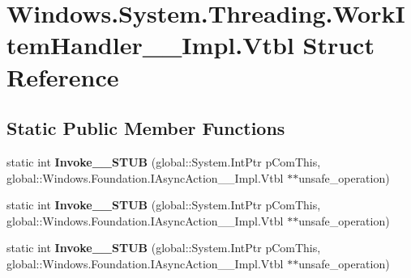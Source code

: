\hypertarget{struct_windows_1_1_system_1_1_threading_1_1_work_item_handler_____impl_1_1_vtbl}{}\section{Windows.\+System.\+Threading.\+Work\+Item\+Handler\+\_\+\+\_\+\+Impl.\+Vtbl Struct Reference}
\label{struct_windows_1_1_system_1_1_threading_1_1_work_item_handler_____impl_1_1_vtbl}
\subsection*{Static Public Member Functions}
\begin{DoxyCompactItemize}
\item 
\mbox{\label{struct_windows_1_1_system_1_1_threading_1_1_work_item_handler_____impl_1_1_vtbl_ac5bdfd83481e2965038502f8e644d2c7}} 
static int {\bfseries Invoke\+\_\+\+\_\+\+S\+T\+UB} (global\+::\+System.\+Int\+Ptr p\+Com\+This, global\+::\+Windows.\+Foundation.\+I\+Async\+Action\+\_\+\+\_\+\+Impl.\+Vtbl $\ast$$\ast$unsafe\+\_\+operation)
\item 
\mbox{\label{struct_windows_1_1_system_1_1_threading_1_1_work_item_handler_____impl_1_1_vtbl_ac5bdfd83481e2965038502f8e644d2c7}} 
static int {\bfseries Invoke\+\_\+\+\_\+\+S\+T\+UB} (global\+::\+System.\+Int\+Ptr p\+Com\+This, global\+::\+Windows.\+Foundation.\+I\+Async\+Action\+\_\+\+\_\+\+Impl.\+Vtbl $\ast$$\ast$unsafe\+\_\+operation)
\item 
\mbox{\label{struct_windows_1_1_system_1_1_threading_1_1_work_item_handler_____impl_1_1_vtbl_ac5bdfd83481e2965038502f8e644d2c7}} 
static int {\bfseries Invoke\+\_\+\+\_\+\+S\+T\+UB} (global\+::\+System.\+Int\+Ptr p\+Com\+This, global\+::\+Windows.\+Foundation.\+I\+Async\+Action\+\_\+\+\_\+\+Impl.\+Vtbl $\ast$$\ast$unsafe\+\_\+operation)
\item 
\mbox{\label{struct_windows_1_1_system_1_1_threading_1_1_work_item_handler_____impl_1_1_vtbl_ac5bdfd83481e2965038502f8e644d2c7}} 
$$
\end{DoxyCompactItemize}
